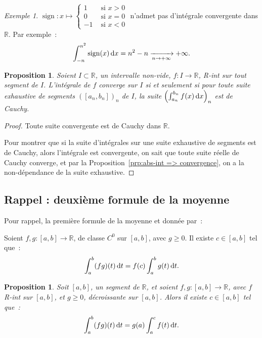 \documentclass{report}
\newtheorem{prp}[thm]{Proposition}
\theoremstyle{definition}
\theoremstyle{remark}
\newtheorem{ex}{Exemple}[chapter]
\numberwithin{equation}{section}
\newcommand{\R}{\mathbb R}
\DeclareMathOperator{\sign}{sign}
\newcommand{\pinfty}{{+\infty}}
\begin{document}
			\begin{ex} $\sign : x \mapsto \begin{cases}1 &\text{ si } x > 0 \\0 &\text{ si }x = 0\\-1 &\text{ si } x < 0\end{cases}$ n'admet pas d'intégrale convergente
			dans $\R$. Par exemple~:
			\begin{equation}
				\int_{-n}^{n^2}\sign(x)\dif x = n^2 - n \xrightarrow[n \to \pinfty]{} \pinfty.
			\end{equation}
			\end{ex}

			\begin{prp} Soient $I \subset \R$, un intervalle non-vide, $f : I \to \R$, R-int sur tout segment de $I$. L'intégrale de $f$ converge sur $I$ si et seulement
			si pour toute suite exhaustive de segments $([a_n, b_n])_n$ de $I$, la suite $\left(\int_{a_n}^{b_n}f(x)\dif x\right)_n$ est de Cauchy.
			\end{prp}

			\begin{proof} Toute suite convergente est de Cauchy dans $\R$.

			Pour montrer que si la suite d'intégrales sur une suite exhaustive de segments est de Cauchy, alors l'intégrale est convergente, on sait que toute
			suite réelle de Cauchy converge, et par la Proposition~\ref{prp:abs-int => convergence}, on a la non-dépendance de la suite exhaustive.
			\end{proof}

		\subsection{Rappel : deuxième formule de la moyenne}
			Pour rappel, la première formule de la moyenne et donnée par~:

			Soient $f, g : [a, b] \to \R$, de classe $C^0$ sur $[a, b]$, avec $g \geq 0$. Il existe $c \in [a, b]$ tel que~:
			\begin{equation}
				\int_a^b(fg)(t)\dif t = f(c)\int_a^bg(t)\dif t.
			\end{equation}

			\begin{prp} Soit $[a, b]$, un segment de $\R$, et soient $f, g : [a, b] \to \R$, avec $f$ R-int sur $[a, b]$, et $g \geq 0$, décroissante sur $[a, b]$.
			Alors il existe $c \in [a, b]$ tel que~:
			\begin{equation}
				\int_a^b(fg)(t)\dif t = g(a)\int_a^cf(t)\dif t.
			\end{equation}
			\end{prp}
\end{document}
